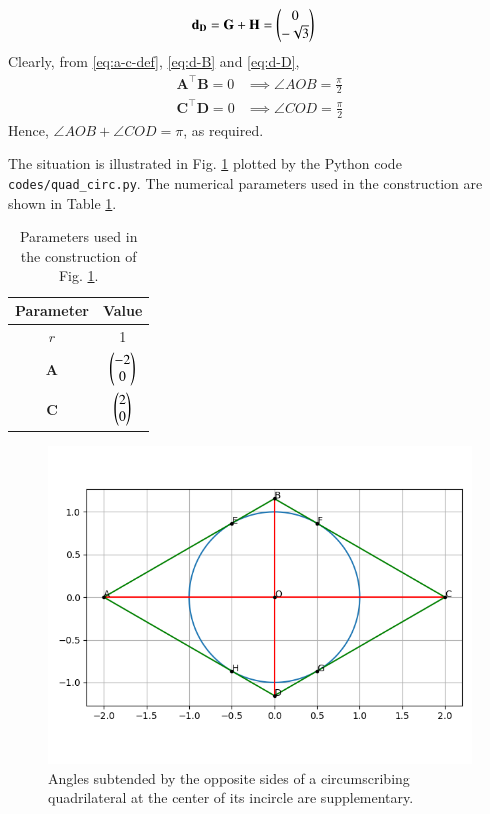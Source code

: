 \documentclass[journal,12pt,twocolumn]{IEEEtran}
\renewcommand{\vec}[1]{\boldsymbol{\mathbf{#1}}}
\begin{document}
\begin{enumerate}
\begin{align}
        \vec{d_D} &= \vec{G} + \vec{H} = \myvec{0\\-\sqrt{3}} \label{eq:d-D}
    \end{align}
    Clearly, from \eqref{eq:a-c-def}, \eqref{eq:d-B} and \eqref{eq:d-D},
    \begin{align}
        \vec{A}^\top\vec{B} = 0 &\implies \angle AOB = \frac{\pi}{2} \\
        \vec{C}^\top\vec{D} = 0 &\implies \angle COD = \frac{\pi}{2}
    \end{align}
    Hence, $\angle AOB + \angle COD = \pi$, as required.

    The situation is illustrated in Fig. \ref{fig:quad-circ} plotted by the 
    Python code \texttt{codes/quad\_circ.py}. The numerical parameters used 
    in the construction are shown in Table \ref{tab:param}.
    \begin{table}[!ht]
        \centering
        \begin{tabular}{|c|c|}
            \hline
            \textbf{Parameter} & \textbf{Value} \\
            \hline
            $r$ & 1 \\
            \hline
            $\vec{A}$ & $\begin{pmatrix}-2\\0\end{pmatrix}$ \\
            \hline
            $\vec{C}$ & $\begin{pmatrix}2\\0\end{pmatrix}$ \\
            \hline
        \end{tabular}
        \caption{Parameters used in the construction of Fig. \ref{fig:quad-circ}.}
        \label{tab:param}
    \end{table}
    \begin{figure}[!ht]
        \centering
        \includegraphics[width=\columnwidth]{figs/quad_circ.png}
        \caption{Angles subtended by the opposite sides of a circumscribing quadrilateral at the center of its incircle are supplementary.}
        \label{fig:quad-circ}
    \end{figure}
\end{enumerate}
\end{document}
